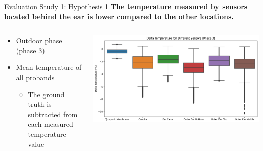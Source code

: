 \documentclass[en]{sdqbeamer}
\begin{document}
\begin{frame}{Evaluation Study 1: Hypothesis 1}
    \textbf{The temperature measured by sensors located behind the ear is lower compared to the other locations.}
    \begin{center}
      \begin{columns}[T]
        \begin{column}{.3\textwidth}
        \vspace{10pt}
          \begin{itemize}
              \item Outdoor phase (phase 3)
              \item Mean temperature of all probands
              \begin{itemize}
                  \item The ground truth is subtracted from each measured temperature value
              \end{itemize}
          \end{itemize}
        \end{column}
        
        \begin{column}{.66\textwidth}
        \includegraphics[width=0.99\linewidth]{../thesis-doc/images/study1/hypothesis1/hypothesis1_boxplot_phase_3.png}
        \end{column}
      \end{columns}
    \end{center}
\end{frame}
\end{document}
